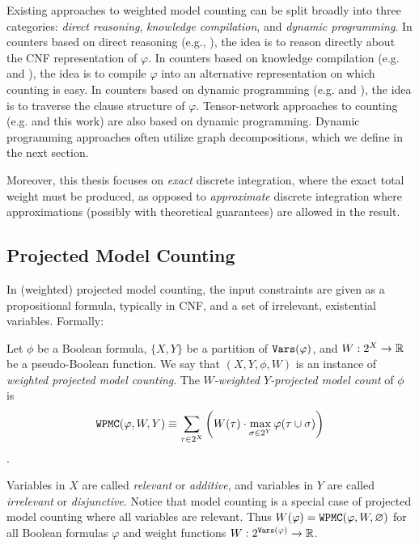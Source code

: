 Existing approaches to weighted model counting can be split broadly into three categories: \emph{direct reasoning}, \emph{knowledge compilation}, and \emph{dynamic programming}. In counters based on direct reasoning (e.g.,  \cite{SBK05}), the idea is to reason directly about the CNF representation of $\varphi$. In counters based on knowledge compilation (e.g.  \cite{OD15} and  \cite{LM17}), the idea is to compile $\varphi$ into an alternative representation on which counting is easy. In counters based on dynamic programming (e.g.  \cite{DPV20} and  \cite{FHWZ18,FHZ19}), the idea is to traverse the clause structure of $\varphi$. Tensor-network approaches to counting (e.g.  \cite{DDV19} and this work) are also based on dynamic programming. Dynamic programming approaches often utilize graph decompositions, which we define in the next section. 

Moreover, this thesis focuses on \emph{exact} discrete integration, where the exact total weight must be produced, as opposed to \emph{approximate} discrete integration where approximations (possibly with theoretical guarantees) are allowed in the result. %

\subsection{Projected Model Counting}
In (weighted) projected model counting, the input constraints are given as a propositional formula, typically in CNF, and a set of irrelevant, existential variables.
Formally:
\begin{definition}
	Let $\phi$ be a Boolean formula, $\{X, Y\}$ be a partition of $\texttt{\upshape Vars}(\varphi)$, and $W: 2^X \to \mathbb{R}$ be a pseudo-Boolean function. We say that $(X, Y, \phi, W)$ is an instance of \emph{weighted projected model counting}.
	The \emph{$W$-weighted $Y$-projected model count} of $\phi$ is
	$$\texttt{\upshape WPMC}(\varphi, W, Y) \equiv \sum_{\tau \in 2^X} \left(  W(\tau) \cdot \max_{\sigma \in 2^Y} \varphi(\tau \cup \sigma)  \right)$$.
\end{definition}

Variables in $X$ are called \emph{relevant} or \emph{additive}, and variables in $Y$ are called \emph{irrelevant} or \emph{disjunctive}. 
Notice that model counting is a special case of projected model counting where all variables are relevant. Thus $W(\varphi) = \texttt{\upshape WPMC}(\varphi, W, \varnothing)$ for all Boolean formulas $\varphi$ and weight functions $W: 2^{\texttt{\upshape Vars}(\varphi)} \rightarrow \mathbb{R}$. 

